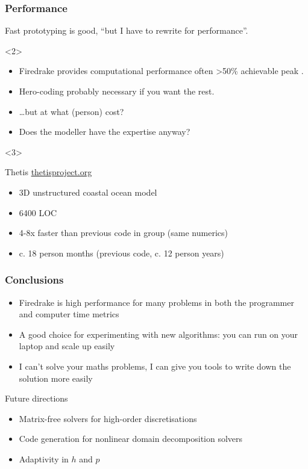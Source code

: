 \documentclass[presentation]{beamer}
\begin{document}
\begin{frame}
  \frametitle{Performance}
  Fast prototyping is good, ``but I have to rewrite for performance''.

  \begin{overlayarea}{\textwidth}{0.6\textheight}
    \begin{onlyenv}<2>
      \begin{itemize}
      \item Firedrake provides computational performance often >50\%
        achievable peak
        \parencite{Luporini:2015,Bercea:2016,Mitchell:2016}.
      \item Hero-coding probably necessary if you want the rest.
      \item \ldots but at what (person) cost?
      \item Does the modeller have the expertise anyway?
      \end{itemize}
    \end{onlyenv}
    \begin{onlyenv}<3>
      \begin{block}{Thetis}
        {\scriptsize \url{thetisproject.org}}
        \begin{itemize}
        \item 3D unstructured coastal ocean model
        \item 6400 LOC
        \item 4-8x faster than previous code in group (same numerics)
        \item c. 18 person months (previous code, c. 12 person years)
        \end{itemize}
      \end{block}
    \end{onlyenv}
  \end{overlayarea}
\end{frame}

\begin{frame}
  \frametitle{Conclusions}
  \begin{itemize}
  \item Firedrake is high performance for many problems in both
    the programmer and computer time metrics
  \item A good choice for experimenting with new algorithms: you can
    run on your laptop and scale up easily
  \item I can't solve your maths problems, I can give you tools to
    write down the solution more easily
  \end{itemize}

  \begin{block}{Future directions}
    \begin{itemize}
    \item Matrix-free solvers for high-order discretisations
    \item Code generation for nonlinear domain decomposition solvers
    \item Adaptivity in $h$ and $p$
    \end{itemize}
  \end{block}
\end{frame}
\end{document}
